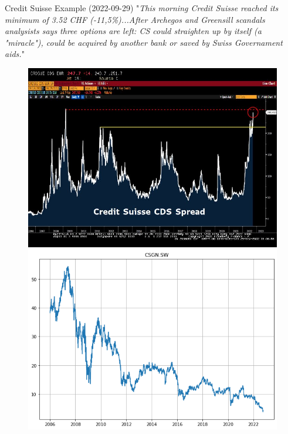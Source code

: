 \documentclass{beamer}
\begin{document}
\begin{frame}{Credit Suisse Example (2022-09-29)}
"\textit{This morning Credit Suisse reached its minimum of 3.52 CHF (-11,5\%)...After Archegos and Greensill scandals analysists says three options are left: CS could straighten up by itself (a "miracle"), could be acquired by another bank or saved by Swiss Governament aids.}"
\begin{figure}[h]
    \begin{center}
    \includegraphics[width=0.45\linewidth]{cds_credit_suisse}\quad
    \includegraphics[width=0.45\linewidth]{price_credit_suisse}
    \end{center}
\end{figure}    
\end{frame}
\end{document}
